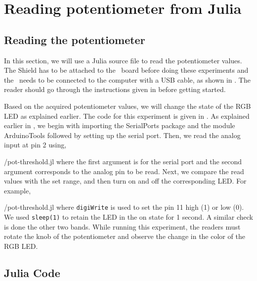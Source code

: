 \section{Reading potentiometer from Julia}
\subsection{Reading the potentiometer}
In this section, we will use a Julia source file to read 
the potentiometer values. The Shield has to be attached to the \arduino\ board
before doing these experiments and the \arduino\ needs to be 
connected to the computer with a USB cable, 
as shown in . The reader should go through the instructions given in 
 before getting started.


Based on the acquired potentiometer values, we will change the 
state of the RGB LED as explained earlier. 
The code for this experiment is given in
. As explained earlier in , we begin with importing the SerialPorts 
\cite{julia-serial-ports} package and the module ArduinoTools followed by setting up the serial port.
Then, we read the analog input at pin 2 using,

{\LocPotjuliacode/pot-threshold.jl} where the first argument is for
the serial port and the second argument corresponds to the analog pin 
to be read.  Next, we compare the read values with the set range, 
and then turn on and off the corresponding LED. For example, 

{\LocPotjuliacode/pot-threshold.jl} where {\tt digiWrite} 
is used to set the pin 11 high (1) or low (0). 
We used {\tt sleep(1)} to retain the LED in the on state for 1 second.  
A similar check is done the other two bands. 
While running this experiment, 
the readers must rotate the knob of the potentiometer and observe 
the change in the color of the RGB LED.
\subsection{Julia Code}
\label{sec:pot-julia-code}
\begin{juliacode}
\label{julia:pot-100}

\end{juliacode}

